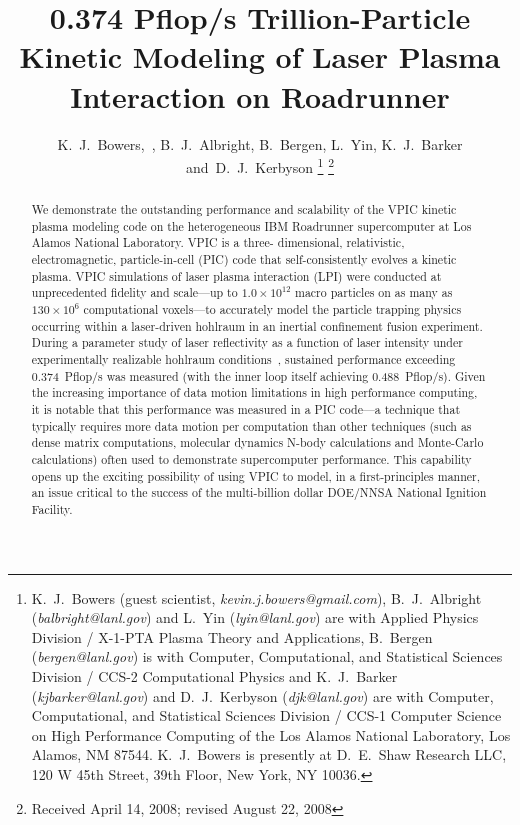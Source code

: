 \documentclass[journal,twoside]{IEEEtran}
\begin{document}
\title{0.374 Pflop/s Trillion-Particle Kinetic Modeling of Laser Plasma
Interaction on Roadrunner}

\author{K.~J.~Bowers,~,
        B.~J.~Albright,
        B.~Bergen,
        L.~Yin,
        K.~J.~Barker
        and~D.~J.~Kerbyson%
\thanks{
K.~J.~Bowers (guest scientist, \emph{kevin.j.bowers@gmail.com}),
B.~J.~Albright (\emph{balbright@lanl.gov}) and L.~Yin
(\emph{lyin@lanl.gov}) are with Applied Physics Division / X-1-PTA
Plasma Theory and Applications, B.~Bergen (\emph{bergen@lanl.gov}) is
with Computer, Computational, and Statistical Sciences Division /
CCS-2 Computational Physics and K.~J.~Barker
(\emph{kjbarker@lanl.gov}) and D.~J.~Kerbyson (\emph{djk@lanl.gov})
are with Computer, Computational, and Statistical Sciences Division /
CCS-1 Computer Science on High Performance Computing of the Los Alamos
National Laboratory, Los Alamos, NM 87544.  K.~J.~Bowers is presently
at D.~E.~Shaw Research LLC, 120 W 45th Street, 39th Floor, New York,
NY 10036.}%
\thanks{Received April 14, 2008; revised August 22, 2008}
}


\maketitle

\begin{abstract}
We demonstrate the outstanding performance and scalability of the VPIC
kinetic plasma modeling code on the heterogeneous IBM Roadrunner
supercomputer at Los Alamos National Laboratory.  VPIC is a three-
dimensional, relativistic, electromagnetic, particle-in-cell (PIC)
code that self-consistently evolves a kinetic plasma.  VPIC
simulations of laser plasma interaction (LPI) were conducted at
unprecedented fidelity and scale---up to $1.0 \times 10^{12}$ macro
particles on as many as $130
\times 10^6$ computational voxels---to accurately model the particle
trapping physics occurring within a laser-driven hohlraum in an
inertial confinement fusion experiment.  During a parameter study of
laser reflectivity as a function of laser intensity under
experimentally realizable hohlraum
conditions~\cite{AAC_Conference_Paper}, sustained performance
exceeding 0.374~Pflop/s was measured (with the inner loop itself
achieving 0.488~Pflop/s).  Given the increasing importance of
data motion limitations in high performance computing, it is notable
that this performance was measured in a PIC code---a technique that
typically requires more data motion per computation than other
techniques (such as dense matrix computations, molecular dynamics
N-body calculations and Monte-Carlo calculations) often used to
demonstrate supercomputer performance.  This capability opens up the
exciting possibility of using VPIC to model, in a first-principles
manner, an issue critical to the success of the multi-billion dollar
DOE/NNSA National Ignition Facility.
\end{abstract}
\end{document}
